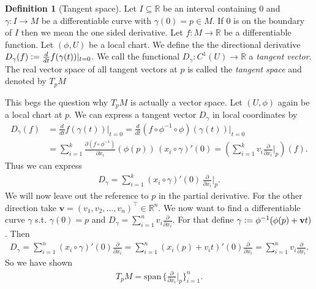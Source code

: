 \documentclass[12pt,a4paper]{article}
\numberwithin{equation}{subsection}
\numberwithin{lemma}{subsection}
\theoremstyle{definition}
\newtheorem{definition}[lemma]{Definition}
\newcommand{\real}{\mathbb{R}}
\begin{document}
\begin{definition}[Tangent space]
    Let $I \subseteq \real$ be an interval containing $0$ and 
    $\gamma: I \rightarrow M$ be a differentiable curve with $\gamma(0) = p \in M$.
    If $0$ is on the boundary of $I$ then we mean the one sided derivative.
    Let $f:M \rightarrow \real$ be a differentiable function. Let
    $(\phi,U)$ be a local chart.
    We define the the directional derivative 
    $D_\gamma(f) \vcentcolon= \frac{d}{dt} f(\gamma(t)) |_{t=0}$.
    We call the functional $D_\gamma: C^1(U) \rightarrow \real$ 
    a \textit{tangent vector}. 
    The real vector space of all tangent vectors at $p$ is called the 
    \textit{tangent space} and denoted by $T_p M$    
\end{definition}
This begs the question why $T_p M$ is actually a vector space. Let $(U,\phi)$ 
again be a local chart at $p$.
We can 
express a tangent vector $D_\gamma$ in local coordinates by 
\begin{align}
    D_\gamma(f) &=  \frac{d}{dt} f(\gamma(t)) \big|_{t=0}
    =  \frac{d}{dt} (f \circ \phi^{-1} \circ \phi)  (\gamma(t)) \big|_{t=0}
    \\ &= \sum\limits_{i=1}^k \frac{\partial (f \circ \phi^{-1})}{\partial x_i} 
        (\phi(p))
        \, (x_i\circ \gamma)'(0)
    = (\sum\limits_{i=1}^k v_i  \frac{\partial}{\partial x_i}\Big|_p )(f).
\end{align}
Thus we can express 
\begin{align*}
    D_\gamma = \sum\limits_{i=1}^k 
    (x_i \circ \gamma)' (0) \, \frac{\partial}{\partial x_i}\bigg|_p.
\end{align*}
We will now leave out the reference to $p$ in the partial derivative.
For the other direction take $\mathbf{v} = (v_1, v_2, ..., v_n)^\top \in \real^n$. 
We now want to find a differentiable curve $\gamma$ s.t. $\gamma(0) = p$ 
and $D_\gamma = \sum_{i=1}^n v_i \frac{\partial}{\partial x_i}$.
For that define $\gamma \vcentcolon= \phi^{-1} (\phi(p) + \mathbf{v}t)$.
Then
\begin{align*}
    D_\gamma = \sum_{i=1}^n (x_i\circ \gamma)'(0) \frac{\partial}{\partial x_i}
    = \sum_{i=1}^n (x_i(p) + v_i t)'(0) \frac{\partial}{\partial x_i}
    = \sum_{i=1}^n v_i \frac{\partial}{\partial x_i}.
\end{align*}
So we have shown 
\begin{align*}
    T_p M = \text{span}\, 
        \bigg\{ \frac{\partial}{\partial x_i}\bigg|_p \bigg\}_{i=1}^n.
\end{align*}
\end{document}
